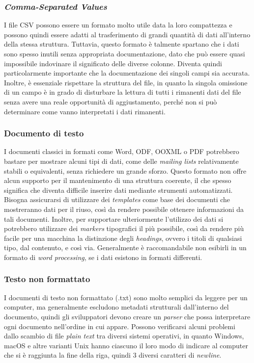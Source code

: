 \subsubsection{\textit{Comma-Separated Values}}
I file CSV possono essere un formato molto utile data la loro compattezza e possono quindi essere adatti al trasferimento di grandi quantità di dati all'interno della stessa struttura. Tuttavia, questo formato è talmente spartano che i dati sono spesso inutili senza appropriata documentazione, dato che può essere quasi impossibile indovinare il significato delle diverse colonne. Diventa quindi particolarmente importante che la documentazione dei singoli campi sia accurata. Inoltre, è essenziale rispettare la struttura del file, in quanto la singola omissione di un campo è in grado di disturbare la lettura di tutti i rimanenti dati del file senza avere una reale opportunità di aggiustamento, perché non si può determinare come vanno interpretati i dati rimanenti.
\subsubsection{Documento di testo}
I documenti classici in formati come Word, ODF, OOXML o PDF potrebbero bastare per mostrare alcuni tipi di dati, come delle \textit{mailing lists} relativamente stabili o equivalenti, senza richiedere un grande sforzo. Questo formato non offre alcun supporto per il mantenimento di una struttura coerente, il che spesso significa che diventa difficile inserire dati mediante strumenti automatizzati. Bisogna assicurarsi di utilizzare dei \textit{templates} come base dei documenti che mostreranno dati per il riuso, così da rendere possibile ottenere informazioni da tali documenti. Inoltre, per supportare ulteriormente l'utilizzo dei dati si potrebbero utilizzare dei \textit{markers} tipografici il più possibile, così da rendere più facile per una macchina la distinzione degli \textit{headings}, ovvero i titoli di qualsiasi tipo, dal contenuto, e così via. Generalmente è raccomandabile non esibirli in un formato di \textit{word processing}, se i dati esistono in formati differenti.
\subsubsection{Testo non formattato}
I documenti di testo non formattato (.txt) sono molto semplici da leggere per un computer, ma generalmente escludono metadati strutturali dall'interno del documento, quindi gli sviluppatori devono creare un \textit{parser} che possa interpretare ogni documento nell'ordine in cui appare. Possono verificarsi alcuni problemi dallo scambio di file \textit{plain text} tra diversi sistemi operativi, in quanto Windows, macOS e altre varianti Unix hanno ciascuno il loro modo di indicare al computer che si è raggiunta la fine della riga, quindi 3 diversi caratteri di \textit{newline}.
